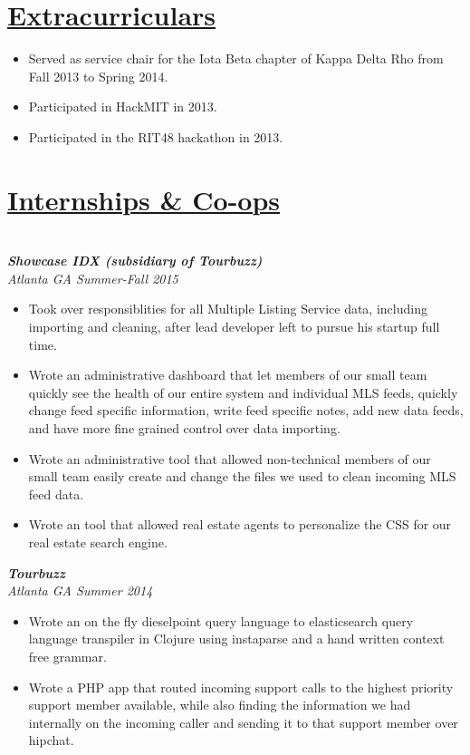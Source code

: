 \documentclass[line,11pt]{res}
\begin{document}
\begin{resume}
\begin{multicols}{2}
\section{\underline{\Large Extracurriculars}}
\begin{itemize}
    \item Served as service chair for the Iota Beta chapter of Kappa Delta Rho from Fall 2013 to Spring 2014.
    \item Participated in HackMIT in 2013.
    \item Participated in the RIT48 hackathon in 2013.
\end{itemize}

\columnbreak

\section{\underline{\Large Internships \& Co-ops}}
\textit{\textbf{\\Showcase IDX (subsidiary of Tourbuzz)}\\ Atlanta GA \hfill{Summer-Fall 2015}}
\begin{itemize}
    \item Took over responsiblities for all Multiple Listing Service data, including importing and cleaning, after lead developer
          left to pursue his startup full time.  
    \item Wrote an administrative dashboard that let members of our small team quickly see the health of
          our entire system and individual MLS feeds, quickly change feed specific information, 
          write feed specific notes, add new data feeds, and have more fine grained control over data importing.
    \item Wrote an administrative tool that allowed non-technical members of our small team easily create and change
          the files we used to clean incoming MLS feed data.
    \item Wrote an tool that allowed real estate agents to personalize the CSS for our real estate search engine.
\end{itemize}

\textit{\textbf{Tourbuzz}\\ Atlanta GA \hfill{Summer 2014}}
\begin{itemize}
    \item Wrote an on the fly dieselpoint query language to elasticsearch query language transpiler in Clojure 
          using instaparse and a hand written context free grammar.
    \item Wrote a PHP app that routed incoming support calls to the highest priority support member available,
          while also finding the information we had internally on the incoming caller and sending it to that 
          support member over hipchat.
\end{itemize}


\end{multicols}
\end{resume}
\end{document}
